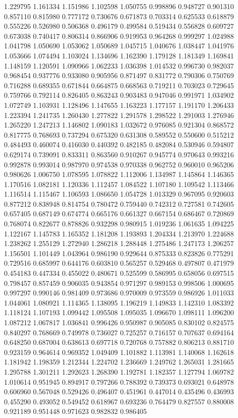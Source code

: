 1.229795
1.161334
1.151986
1.102598
1.050755
0.998896
0.948727
0.901310
0.857110
0.815980
0.777172
0.730676
0.671873
0.703314
0.625533
0.618879
0.555226
0.526980
0.506368
0.496179
0.499584
0.519434
0.556828
0.609727
0.673038
0.740417
0.806314
0.866906
0.919953
0.964268
0.999297
1.024988
1.041798
1.050690
1.053062
1.050689
1.045715
1.040676
1.038447
1.041976
1.053666
1.074494
1.103024
1.134696
1.162390
1.179128
1.181349
1.169841
1.148159
1.120591
1.090966
1.062233
1.036398
1.014532
0.996730
0.982037
0.968454
0.937776
0.933080
0.905956
0.871497
0.831772
0.790306
0.750769
0.716288
0.689355
0.671844
0.664875
0.668563
0.719211
0.703023
0.729645
0.759766
0.792114
0.826405
0.863243
0.903483
0.947046
0.991971
1.034902
1.072749
1.103931
1.128496
1.147655
1.163223
1.177157
1.191170
1.206433
1.223394
1.241735
1.260430
1.277822
1.291578
1.298522
1.291003
1.276946
1.265220
1.247213
1.146802
1.090183
1.032672
0.976085
0.921304
0.868572
0.817775
0.768693
0.737294
0.675320
0.631308
0.589552
0.550600
0.515212
0.484493
0.460074
0.416030
0.440392
0.482185
0.482084
0.530946
0.594807
0.629174
0.739091
0.833311
0.863560
0.910267
0.945774
0.970643
0.993216
0.992878
0.993014
0.987970
0.974538
0.970338
0.962752
0.960010
0.965206
0.980626
1.006750
1.078595
1.078822
1.112006
1.134987
1.145864
1.146365
1.170516
1.082181
1.120336
1.112457
1.084522
1.107180
1.109542
1.113466
1.116514
1.115467
1.106593
1.086650
1.054728
1.013329
0.967095
0.920603
0.877212
0.838948
0.814754
0.780472
0.759440
0.742312
0.727581
0.742605
0.657405
0.687149
0.674774
0.665176
0.661327
0.667154
0.686467
0.720869
0.768074
0.822677
0.878826
0.932298
0.980915
1.019236
1.061635
1.094225
1.122167
1.145783
1.165352
1.181208
1.193893
1.204334
1.213970
1.224688
1.238262
1.255129
1.272940
1.286218
1.288448
1.275486
1.247173
1.206257
1.156501
1.101449
1.043964
0.986190
0.929644
0.875333
0.823826
0.775291
0.729516
0.685997
0.644176
0.603810
0.565257
0.529468
0.497807
0.471979
0.454183
0.447334
0.455022
0.480671
0.525599
0.586995
0.658056
0.697515
0.798457
0.857459
0.906035
0.943854
0.971297
0.989153
0.998506
1.000695
0.997297
0.990146
0.981409
0.973686
0.970009
0.973559
0.986926
1.011033
1.044061
1.080921
1.114365
1.138095
1.196219
1.149833
1.142310
1.083392
1.118124
1.107193
1.099442
1.095508
1.095035
1.096670
1.098111
1.096200
1.087212
1.067817
1.036841
0.996426
0.950987
0.905085
0.830102
0.824575
0.840297
0.768669
0.749978
0.736027
0.725257
0.716157
0.707637
0.694164
0.648250
0.687004
0.638613
0.697718
0.720768
0.757882
0.806213
0.881710
0.923159
0.964614
0.969352
1.049409
1.101882
1.113981
1.140068
1.162618
1.181942
1.198359
1.212344
1.224702
1.236669
1.249762
1.265031
1.281665
1.295788
1.301211
1.292623
1.268390
1.192781
1.182357
1.127794
1.069782
1.010614
0.951945
0.894917
0.797266
0.788392
0.739373
0.693021
0.648978
0.606960
0.567048
0.529426
0.496407
0.451961
0.447014
0.435496
0.436993
0.455290
0.493052
0.549452
0.618967
0.693236
0.764479
0.827557
0.880008
0.921189
0.951448
0.971623
0.982832
0.986405
